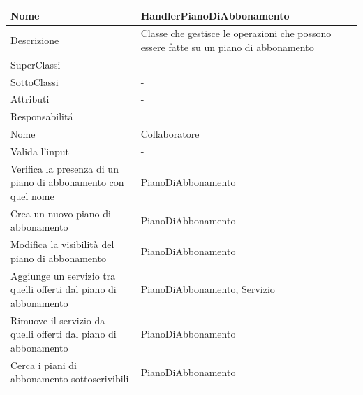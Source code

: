 \begin{center}
    \begin{longtable}{ |p{3cm}|p{3cm}|p{3cm}|p{3cm}| }
        \hline
        Nome & \multicolumn{3}{|p{9cm}|}{HandlerPianoDiAbbonamento} \\\hline
        Descrizione & \multicolumn{3}{|p{9cm}|}{Classe che gestisce le operazioni che possono essere fatte su un piano di abbonamento} \\\hline
        SuperClassi & \multicolumn{3}{|p{9cm}|}{-} \\\hline
        SottoClassi & \multicolumn{3}{|p{9cm}|}{-} \\\hline
        Attributi & \multicolumn{3}{|p{9cm}|}{-} \\\hline
        \multicolumn{4}{|p{12cm}|}{Responsabilit\'a} \\\hline
        \multicolumn{2}{|p{6cm}|}{Nome} & \multicolumn{2}{|p{6cm}|}{Collaboratore} \\\hline
        \multicolumn{2}{|p{6cm}|}{Valida l'input} & \multicolumn{2}{|p{6cm}|}{-} \\\hline
        \multicolumn{2}{|p{6cm}|}{Verifica la presenza di un piano di abbonamento con quel nome} & \multicolumn{2}{|p{6cm}|}{PianoDiAbbonamento} \\\hline
        \multicolumn{2}{|p{6cm}|}{Crea un nuovo piano di abbonamento} & \multicolumn{2}{|p{6cm}|}{PianoDiAbbonamento} \\\hline
        \multicolumn{2}{|p{6cm}|}{Modifica la visibilità del piano di abbonamento} & \multicolumn{2}{|p{6cm}|}{PianoDiAbbonamento} \\\hline
        \multicolumn{2}{|p{6cm}|}{Aggiunge un servizio tra quelli offerti dal piano di abbonamento} & \multicolumn{2}{|p{6cm}|}{PianoDiAbbonamento, Servizio} \\\hline
        \multicolumn{2}{|p{6cm}|}{Rimuove il servizio da quelli offerti dal piano di abbonamento} & \multicolumn{2}{|p{6cm}|}{PianoDiAbbonamento} \\\hline
        \multicolumn{2}{|p{6cm}|}{Cerca i piani di abbonamento sottoscrivibili} & \multicolumn{2}{|p{6cm}|}{PianoDiAbbonamento} \\\hline
    \end{longtable}
\end{center}

